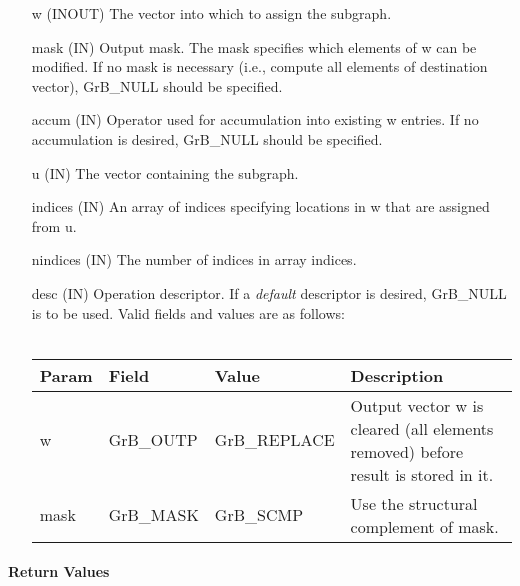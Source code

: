 \begin{itemize}[leftmargin=1.1in]
    \item[{\sf w}]    ({\sf INOUT}) The vector into which to assign the subgraph.
    \item[{\sf mask}] ({\sf IN}) Output mask. The mask specifies which elements
    of {\sf w} can be modified. If no mask is necessary (i.e., compute all
    elements of destination vector), {\sf GrB\_NULL} should be specified.
    \item[{\sf accum}] ({\sf IN}) Operator used for accumulation into existing {\sf w} entries.  If no accumulation
                        is desired, {\sf GrB\_NULL} should be specified.
    \item[{\sf u}]     ({\sf IN}) The vector containing the subgraph.
    \item[{\sf indices}] ({\sf IN}) An array of indices specifying locations in {\sf w} that
                          are assigned from {\sf u}.
    \item[{\sf nindices}] ({\sf IN}) The number of indices in array {\sf indices}.
    \item[{\sf desc}]     ({\sf IN}) Operation descriptor. If a
    \emph{default} descriptor is desired, {\sf GrB\_NULL} is to be
    used. Valid fields and values are as follows: \\ ~\\
    \begin{tabular}{lllp{2.5in}}
    Param & Field  & Value & Description \\
    \hline
    {\sf w}   & {\sf GrB\_OUTP} & {\sf GrB\_REPLACE} & Output vector {\sf w} 
                                       is cleared (all elements removed) before 
                                       result is stored in it.\\
    {\sf mask}& {\sf GrB\_MASK} & {\sf GrB\_SCMP}   & Use the structural complement of {\sf mask}. \\
    \end{tabular}
\end{itemize}

\paragraph{Return Values}


